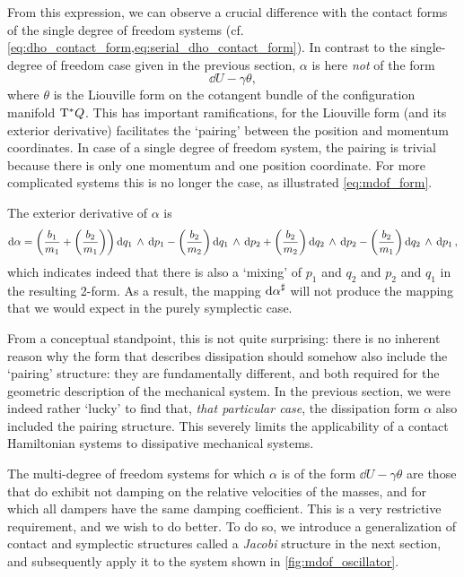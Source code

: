 From this expression, we can observe a crucial difference with the contact forms of the single degree of freedom systems (cf. \cref{eq:dho_contact_form,eq:serial_dho_contact_form}). In contrast to the single-degree of freedom case given in the previous section, $\alpha$ is here \emph{not} of the form
$$ \dd{U} - \gamma \theta, $$
where $\theta$ is the Liouville form on the cotangent bundle of the configuration manifold $\mathrm{T}^*Q$. This has important ramifications, for the Liouville form (and its exterior derivative) facilitates the `pairing' between the position and momentum coordinates. In case of a single degree of freedom system, the pairing is trivial because there is only one momentum and one position coordinate. For more complicated systems this is no longer the case, as illustrated \cref{eq:mdof_form}.

The exterior derivative of $\alpha$ is
$$
    \dd{\alpha} = \qty(\frac{b_1}{m_1} + \qty(\frac{b_2}{m_1}))  \dd{q_1}\,\wedge\,\dd{p_1} 
                  -\qty(\frac{b_2}{m_2}) \dd{q_1}\,\wedge\,\dd{p_2} 
                  + \qty(\frac{b_2}{m_2}) \dd{q_2}\,\wedge\,\dd{p_2} 
                  - \qty(\frac{b_2}{m_1}) \dd{q_2}\,\wedge\,\dd{p_1} ,
$$
which indicates indeed that there is also a `mixing' of $p_1$ and $q_2$ and $p_2$ and $q_1$ in the resulting 2-form. As a result, the mapping $ \dd{\alpha}^\sharp $ will not produce the mapping that we would expect in the purely symplectic case.

From a conceptual standpoint, this is not quite surprising: there is no inherent reason why the form that describes dissipation should somehow also include the `pairing' structure: they are fundamentally different, and both required for the geometric description of the mechanical system. In the previous section, we were indeed rather `lucky' to find that, \emph{that particular case}, the dissipation form $\alpha$ also included the pairing structure. This severely limits the applicability of a contact Hamiltonian systems to dissipative mechanical systems.

The multi-degree of freedom systems for which $ \alpha $ is of the form $\dd{U} - \gamma \theta$ are those that do exhibit not damping on the relative velocities of the masses, and for which all dampers have the same damping coefficient. This is a very restrictive requirement, and we wish to do better. To do so, we introduce a generalization of contact and symplectic structures called a \emph{Jacobi} structure in the next section, and subsequently apply it to the system shown in \cref{fig:mdof_oscillator}.

